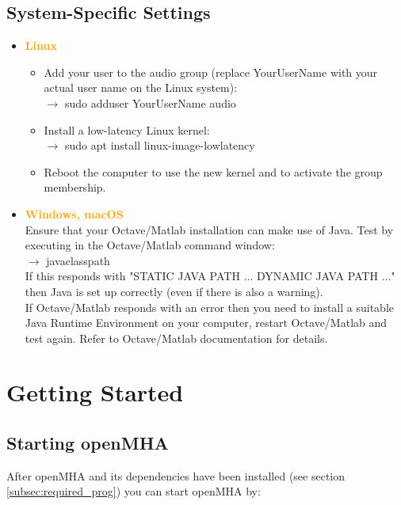 \documentclass[11pt,a4paper,twoside]{article}
\newcommand{\+}{\discretionary{\mbox{\scriptsize$\hookleftarrow$}}{}{}}
\begin{document}
\subsection{System-Specific Settings}

\begin{itemize}
\item \textcolor{orange}{\textbf{Linux}}
  \begin{itemize}
  \item Add your user to the {\ttfamily audio} group (replace {\ttfamily
    YourUserName} with your actual user name on the Linux system): \\
    $\rightarrow$ {\ttfamily sudo adduser YourUserName audio}
  \item Install a low-latency Linux kernel: \\
    $\rightarrow$ {\ttfamily sudo apt install linux-image-lowlatency}
  \item Reboot the computer to use the new kernel and to activate the group
    membership.
  \end{itemize}
\item \textcolor{orange}{\textbf{Windows, macOS}} \\
  Ensure that your Octave/Matlab installation can make use of Java.
  Test by executing in the Octave/Matlab command window: \\
  $\rightarrow$ {\ttfamily javaclasspath} \\
  If this responds with "STATIC JAVA PATH ... DYNAMIC JAVA PATH ..." then
  Java is set up correctly (even if there is also a warning).
  \\ If Octave/Matlab responds with an error then you need to install a
  suitable Java Runtime Environment on your computer, restart Octave/Matlab
  and test again. Refer to Octave/Matlab documentation for details.
\end{itemize}

\section{Getting Started}

\subsection{Starting openMHA}
\label{starting_openmha}
    
After openMHA and its dependencies have been installed
(see section \ref{subsec:required_prog}) you can start openMHA by: 
\end{document}

